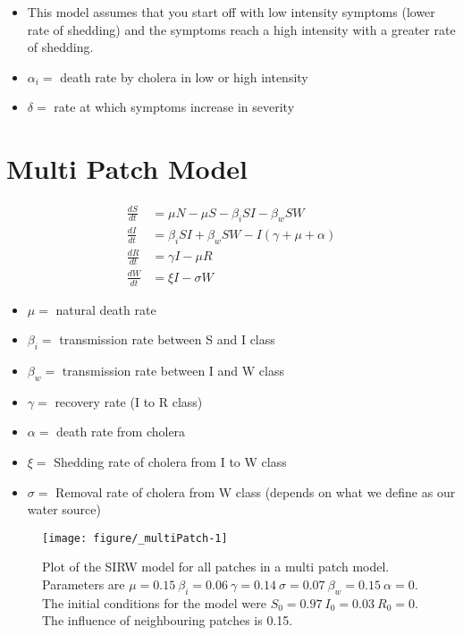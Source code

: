 \documentclass[12pt]{article}\usepackage[]{graphicx}\usepackage[]{color}
\makeatletter
\def\maxwidth{ %
  \ifdim\Gin@nat@width>\linewidth
    \linewidth
  \else
    \Gin@nat@width
  \fi
}
\newenvironment{knitrout}{}{} %
\makeatother
\begin{document}
\begin{itemize}
	\item This model assumes that you start off with low intensity symptoms (lower rate of shedding) and the symptoms reach a high intensity with a greater rate of shedding.
	\item$\alpha_i=$ death rate by cholera in low or high intensity
	\item$\delta =$ rate at which symptoms increase in severity
\end{itemize}

\section{Multi Patch Model}

\begin{linenomath}
\begin{align*}
    \frac{dS}{dt}&= \mu N - \mu S - \beta_i SI - \beta_w S W  \\
    \frac{dI}{dt}&= \beta_i S I + \beta_w S W - I (\gamma + \mu + \alpha) \\
    \frac{dR}{dt}&= \gamma I - \mu R \\
    \frac{dW}{dt}&= \xi I  - \sigma W
\end{align*}
\end{linenomath}

\begin{itemize}
    \item$\mu=$ natural death rate
    \item$\beta_i=$ transmission rate between S and I class
    \item$\beta_w=$ transmission rate between I and W class
    \item$\gamma=$ recovery rate (I to R class)
    \item$\alpha=$ death rate from cholera
    \item$\xi=$ Shedding rate of cholera from I to W class
    \item$\sigma=$	Removal rate of cholera from W class (depends on what we define as our water source)
\end{itemize}


\begin{knitrout}
\color{fgcolor}\begin{figure}
\texttt{[image: figure/\_multiPatch-1]} \caption{\label{fig:multipatch} Plot of the SIRW model for all patches in a multi patch model. Parameters are $\mu=0.15\ \beta_i=0.06\ \gamma=0.14\ \sigma=0.07\ \beta_w=0.15\ \alpha=0$. The initial conditions for the model were $S_0=0.97\ I_0=0.03\ R_0=0$. The influence of neighbouring patches is 0.15.}\label{fig:<multiPatch}
\end{figure}


\end{knitrout}
\FloatBarrier
\end{document}
